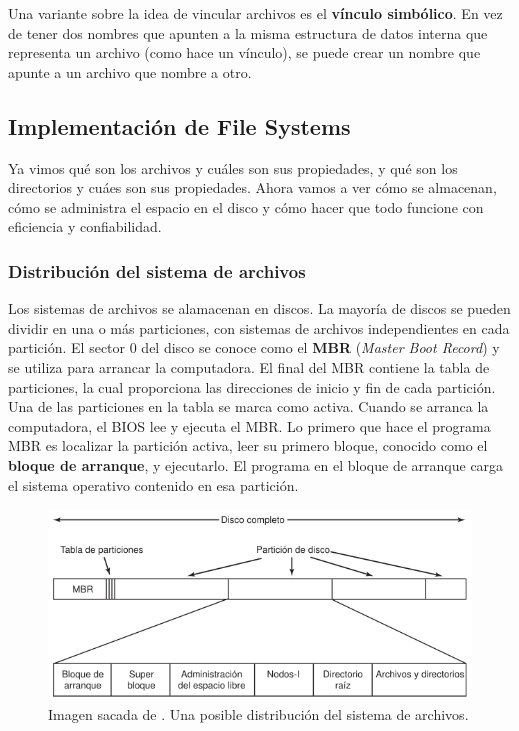 \documentclass[12pt]{article}
\begin{document}
  Una variante sobre la idea de vincular archivos es el \textbf{vínculo simbólico}. En vez de tener dos nombres que apunten a la misma estructura de datos interna que representa un archivo (como hace un vínculo), se puede crear un nombre que apunte a un archivo que nombre a otro.

  \subsection{Implementación de File Systems}
  Ya vimos qué son los archivos y cuáles son sus propiedades, y qué son los directorios y cuáes son sus propiedades. Ahora vamos a ver cómo se almacenan, cómo se administra el espacio en el disco y cómo hacer que todo funcione con eficiencia y confiabilidad.

  \subsubsection{Distribución del sistema de archivos}
  Los sistemas de archivos se alamacenan en discos. La mayoría de discos se pueden dividir en una o más particiones, con sistemas de archivos independientes en cada partición. El sector 0 del disco se conoce como el \textbf{MBR} (\textit{Master Boot Record}) y se utiliza para arrancar la computadora. El final del MBR contiene la tabla de particiones, la cual proporciona las direcciones de inicio y fin de cada partición. Una de las particiones en la tabla se marca como activa. Cuando se arranca la computadora, el BIOS lee y ejecuta el MBR. Lo primero que hace el programa MBR es localizar la partición activa, leer su primero bloque, conocido como el \textbf{bloque de arranque}, y ejecutarlo. El programa en el bloque de arranque carga el sistema operativo contenido en esa partición. 

  \begin{figure}[H]
    \centering
    \includegraphics[width=\linewidth]{imagenes/distro-sistema-archivos.png}
    \caption{Imagen sacada de \parencite{tanenbaum}. Una posible distribución del sistema de archivos.}
    \label{fig:distro-file-system}
  \end{figure}
  
\end{document}
